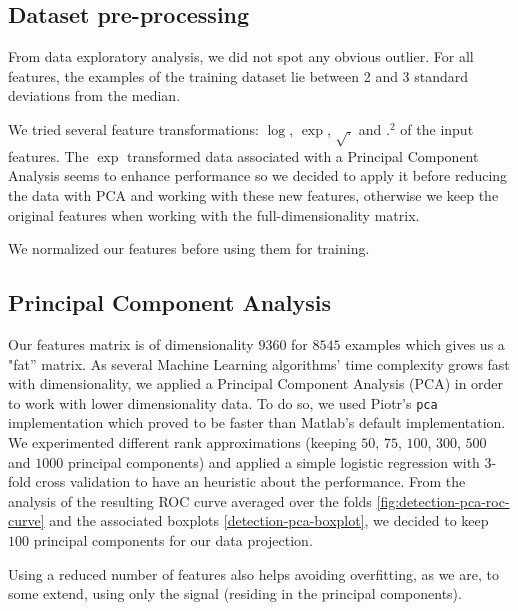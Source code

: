 \documentclass{article}
\begin{document}
  \subsection{Dataset pre-processing}
  From data exploratory analysis, we did not spot any obvious outlier. For all features, the examples of the training dataset lie between 2 and 3 standard deviations from the median.

  We tried several feature transformations: $\log$, $\exp$, $\sqrt{.}$ and $.^2$ of the input features. The $\exp$ transformed data associated with a Principal Component Analysis seems to enhance performance so we decided to apply it before reducing the data with PCA and working with these new features, otherwise we keep the original features when working with the full-dimensionality matrix.

  We normalized our features before using them for training.

  \subsection{Principal Component Analysis}
  Our features matrix is of dimensionality $9360$ for $8545$ examples which gives us a "fat'' matrix. As several Machine Learning algorithms' time complexity grows fast with dimensionality, we applied a Principal Component Analysis (PCA) in order to work with lower dimensionality data. To do so, we used Piotr's \texttt{pca} implementation which proved to be faster than Matlab's default implementation. We experimented different rank approximations (keeping $50$, $75$, $100$, $300$, $500$ and $1000$ principal components) and applied a simple logistic regression with 3-fold cross validation to have an heuristic about the performance. From the analysis of the resulting ROC curve averaged over the folds \ref{fig:detection-pca-roc-curve} and the associated boxplots \ref{detection-pca-boxplot}, we decided to keep $100$ principal components for our data projection.
  
  Using a reduced number of features also helps avoiding overfitting, as we are, to some extend, using only the signal (residing in the principal components).
\end{document}
